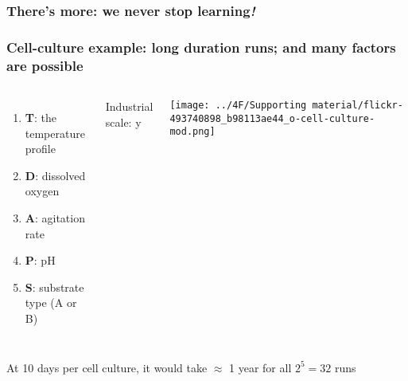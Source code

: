 \begin{frame}\frametitle{There's more: we never stop learning\emph{!}}
	\centerline{
	}
\end{frame}	

\begin{frame}\frametitle{Cell-culture example: long duration runs; and many factors are possible}
	\newcommand{\white}{\color{white}}
	\begin{columns}[c]
			\begin{enumerate}
				\item	\textbf{T}: the temperature profile
				\item	\textbf{D}: dissolved oxygen
				\item	\textbf{A}: agitation rate
				\item	\textbf{P}: pH
				\item	\textbf{S}: substrate type (A or B)
			\end{enumerate}
		
			{\color{blue} \small Industrial scale: {\color{white}y}}   
			
			\vspace{0.2cm}
			
			\centerline{\texttt{[image: ../4F/Supporting material/flickr-493740898\_b98113ae44\_o-cell-culture-mod.png]}}
	\end{columns}

	\vfill
	At 10 days per cell culture, it would take $\approx$ 1 year for all $2^5 = 32$ runs
	
\end{frame}

